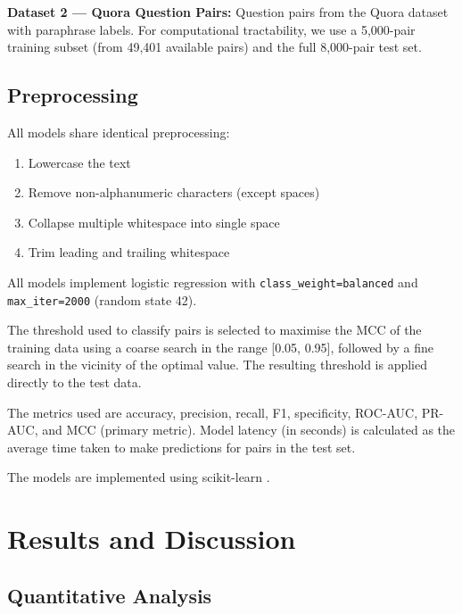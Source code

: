 \documentclass[conference]{IEEEtran}
\begin{document}
\textbf{Dataset 2 --- Quora Question Pairs:} Question pairs from the Quora
dataset with paraphrase labels. For computational tractability, we use a
5,000-pair training subset (from 49,401 available pairs) and the full
8,000-pair test set.


\subsection{Preprocessing}

All models share identical preprocessing:
\begin{enumerate}
    \item Lowercase the text
    \item Remove non-alphanumeric characters (except spaces)
    \item Collapse multiple whitespace into single space
    \item Trim leading and trailing whitespace
\end{enumerate}

All models implement logistic regression with
\texttt{class\_weight=balanced} and \texttt{max\_iter=2000}
(random state 42).

The threshold used to classify pairs is selected to maximise
the MCC of the training data using a coarse search in the range
[0.05, 0.95], followed by a fine search in the vicinity of the
optimal value. The resulting threshold is applied directly to
the test data.

The metrics used are accuracy, precision, recall, F1, specificity,
ROC-AUC, PR-AUC, and MCC (primary metric). Model latency
(in seconds) is calculated as the average time taken to make
predictions for pairs in the test set.

The models are implemented using scikit-learn \cite{pedregosa2011}.


\section{Results and Discussion}

\subsection{Quantitative Analysis}
\end{document}
